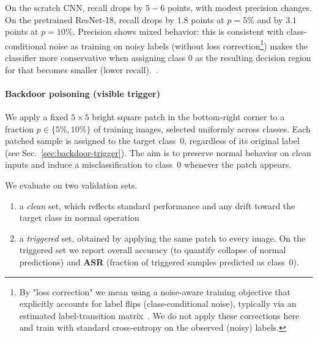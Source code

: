 \documentclass{article}
\begin{document}
On the scratch CNN, recall drops by $5-6$ points, with modest precision changes. On the pretrained ResNet-18, recall drops by $1.8$ points at $p{=}5\%$ and by $3.1$ points at $p{=}10\%$. Precision shows mixed behavior: this is consistent with class-conditional noise as training on noisy labels (without loss correction\footnote{By "loss correction" we mean using a noise-aware training objective that explicitly accounts for label flips (class-conditional noise), typically via an estimated label-transition matrix~\cite{patrini2017makingdeepneuralnetworks}. We do not apply these corrections here and train with standard cross-entropy on the observed (noisy) labels.}) makes the classifier more conservative when assigning class 0 as the resulting decision region for that becomes smaller (lower recall).~\cite{patrini2017makingdeepneuralnetworks}.


\paragraph{Backdoor poisoning (visible trigger)}
We apply a fixed $5{\times}5$ bright square patch in the bottom-right corner to a fraction $p\in\{5\%,10\%\}$ of training images, selected uniformly across classes. Each patched sample is assigned to the target class~0, regardless of its original label (see Sec.~\ref{sec:backdoor-trigger}). The aim is to preserve normal behavior on clean inputs and induce a misclassification to class~0 whenever the patch appears.

We evaluate on two validation sets.
\begin{enumerate}[noitemsep, topsep=2pt, parsep=0pt, partopsep=0pt, leftmargin=*]
  \item a \emph{clean} set, which reflects standard performance and any drift toward the target class in normal operation
  \item a \emph{triggered} set, obtained by applying the same patch to every image. On the triggered set we report overall accuracy (to quantify collapse of normal predictions) and \textbf{ASR} (fraction of triggered samples predicted as class~0).
\end{enumerate}
\end{document}
